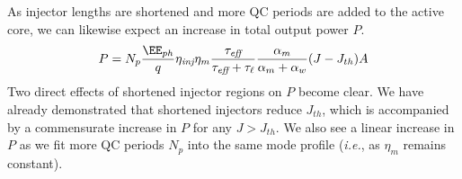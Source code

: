 As injector lengths are shortened and more QC periods are added to the active core, we can likewise expect an increase in total output power $P$.
\begin{equation}
P = N_p \frac{\EE_{ph}}{q} \eta_\textit{inj} \eta_m \frac{\tau_\textit{eff}}{\tau_\textit{eff}+\tau_{\ell}} \frac{\alpha_m}{\alpha_m + \alpha_w} (J-J_{th}) A
\end{equation}
Two direct effects of shortened injector regions on $P$ become clear.  We have already demonstrated that shortened injectors reduce $J_{th}$, which is accompanied by a commensurate increase in $P$ for any $J > J_{th}$.  We also see a linear increase in $P$ as we fit more QC periods $N_p$ into the same mode profile (\emph{i.e.}, as $\eta_m$ remains constant).

